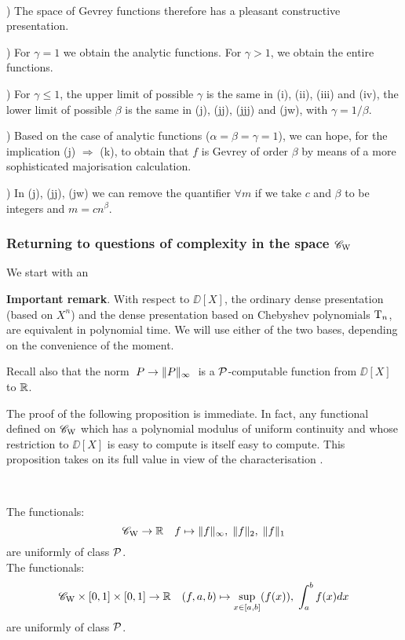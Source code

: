 \begin{remarks}\label{524}~

) The space of Gevrey functions therefore has a pleasant constructive presentation.

) For $\gamma = 1$ we obtain the analytic functions. For $\gamma > 1$, we obtain the entire functions.

) For $\gamma \leq 1$, the upper limit of possible $\gamma$ is the same in (i), (ii), (iii) and (iv), the lower limit of possible $\beta$ is the same in (j), (jj), (jjj) and (jw), with $\gamma = 1/ \beta$. 

) Based on the case of analytic functions ($\alpha = \beta = \gamma = 1$), we can hope, for the implication (j) $\Rightarrow$ (k), to obtain that $f$ is Gevrey of order $\beta$ by means of a more sophisticated majorisation calculation.

) In (j), (jj), (jw) we can remove the quantifier $\forall m$ if we take $ c$ and $\beta$ to be integers and $m = cn^{\beta}$.
\end{remarks} 


\subsubsection{Returning to questions of complexity in the space ${{{\mathscr C}}_{\rm W}}$}
\label{subsubsec 523}

We start with an

\smallskip \noindent 
{\bf Important remark}. With respect to $\DD[X]$, the ordinary dense presentation (based on $X^n$) and the dense presentation based on Chebyshev polynomials ${\rm T}_n$, are equivalent in polynomial time. We will use either of the two bases, depending on the convenience of the moment.

\smallskip  Recall also that the norm $\; P \to \lVert  P  \rVert_{\infty}\; $ is a ${\cal P}$-computable function from $\DD[X]$ to $\mathbb {R}$.

The proof of the following proposition is immediate. In fact, any functional defined on ${{{\mathscr C}}_{\rm W}}$ which has a polynomial modulus of uniform continuity and whose restriction to $\DD[X]$ is easy to compute is itself easy to compute. This proposition takes on its full value in view of the characterisation .

\begin{proposition} \label{526}~ 

\noindent 
The functionals:
\[
{{{\mathscr C}}_{\rm W}} \to \mathbb {R} \quad  f \mapsto \lVert f \rVert_{\infty}, \; \lVert f \rVert_2, \; \lVert f \rVert_1
\]
are  uniformly of class ${\cal P}$.\\
The functionals:
\[
{{{\mathscr C}}_{\rm W}} \times [0,1] \times [0,1] \to \mathbb {R} \quad  (f,a,b) \mapsto \sup_{x 
\in [a,b]} (f(x)), \; \int_{a}^{b} f(x) dx
\]
are uniformly of class ${\cal P}$.
\end{proposition}

